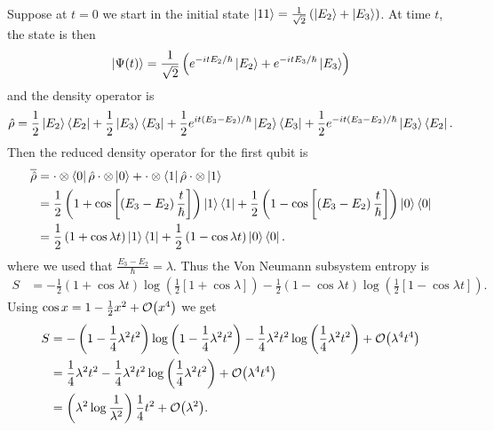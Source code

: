 Suppose at \(t=0\) we start in the initial state \(\left|11\right\rangle = \frac{1}{\sqrt{2}}\left(\left|E_2\right\rangle+\left|E_3\right\rangle\right)\). At time \(t\), the state is then
\[
\left|\Psi(t)\right\rangle = \frac{1}{\sqrt{2}}\left(e^{-itE_2/\hbar}\left|E_2\right\rangle + e^{-itE_3/\hbar} \left|E_3\right\rangle\right)
\]
and the density operator is
\[
\hat{\rho} = \frac{1}{2}\left|E_2\right\rangle\left\langle E_2\right| + \frac{1}{2}\left|E_3\right\rangle\left\langle E_3\right| + \frac{1}{2} e^{it\left(E_3-E_2\right)/\hbar} \left|E_2\right\rangle\left\langle E_3\right| + \frac{1}{2} e^{-it\left(E_3 - E_2\right)/\hbar} \left|E_3\right\rangle\left\langle E_2\right|.
\]
Then the reduced density operator for the first qubit is
\begin{align*}
\overline{\hat{\rho}} &= \cdot\otimes\left\langle0\right| \hat{\rho} \cdot\otimes\left|0\right\rangle + \cdot\otimes\left\langle1\right| \hat{\rho} \cdot\otimes\left|1\right\rangle \\
&= \frac{1}{2}\left(1 + \cos \left[\left(E_3-E_2\right)\frac{t}{\hbar}\right] \right)\left|1\right\rangle\left\langle1\right| + \frac{1}{2}\left(1 -\cos \left[\left(E_3-E_2\right)\frac{t}{\hbar}\right] \right)\left|0\right\rangle\left\langle0\right| \\
&= \frac{1}{2}\left(1 + \cos \lambda t \right)\left|1\right\rangle\left\langle1\right| + \frac{1}{2}\left(1 -\cos \lambda t \right)\left|0\right\rangle\left\langle0\right|.
\end{align*}
where we used that \(\frac{E_3-E_2}{\hbar} = \lambda\). Thus the Von Neumann subsystem entropy is
\begin{align*}
S &= -\frac{1}{2}\left(1 + \cos \lambda t \right)\log \left(\frac{1}{2}\left[1+\cos \lambda\right]\right)
- \frac{1}{2}\left(1 - \cos \lambda t \right)\log \left(\frac{1}{2}\left[1-\cos\lambda t\right]\right).
\end{align*}
Using \(\cos x = 1-\frac{1}{2} x^2 + \mathcal{O}{\left(x^4\right)}\) we get
\begin{align*}
S &=- \left(1-\frac{1}{4}\lambda^2 t^2\right) \log \left(1-\frac{1}{4}\lambda^2 t^2\right) - \frac{1}{4}\lambda^2 t^2 \log \left(\frac{1}{4}\lambda^2 t^2\right) + \mathcal{O}{\left(\lambda^4 t^4\right)}\\
&=\frac{1}{4}\lambda^2 t^2 - \frac{1}{4}\lambda^2 t^2 \log \left(\frac{1}{4}\lambda^2 t^2\right) + \mathcal{O}{\left(\lambda^4 t^4\right)}\\
&= \left(\lambda^2 \log \frac{1}{\lambda^2}\right) \frac{1}{4} t^2 + \mathcal{O}{\left(\lambda^2\right)}.
\end{align*}

